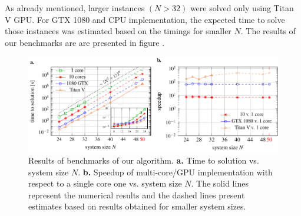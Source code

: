 As already mentioned, larger instances $(N > 32)$ were solved only using Titan V GPU. For GTX 1080 and CPU implementation, the expected time to solve those instances was estimated based on the timings for smaller $N$. The results of our benchmarks are are presented in figure .

\begin{figure}
    \centering
    \includegraphics[width=\textwidth]{figures/resultsplot_reduced.pdf}
    \caption{Results of benchmarks of our algorithm. {\textbf{a.}} Time to solution vs. system size $N$. {\textbf{b.}} Speedup of multi-core/GPU implementation with respect to a single core one vs. system size $N$. The solid lines represent the numerical results and the dashed lines present estimates based on results obtained for smaller system sizes.}
    \label{fig:benchmark_results}
\end{figure}